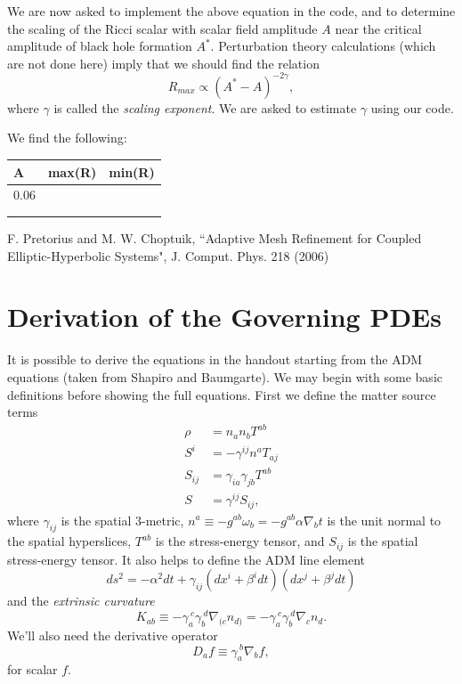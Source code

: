 \documentclass[12pt]{article}
\numberwithin{equation}{section}
\begin{document}
We are now asked to implement the above equation in the code, and to determine the scaling of the Ricci scalar with scalar field amplitude $A$ near the critical amplitude of black hole formation $A^*$.  Perturbation theory calculations (which are not done here) imply that we should find the relation
\begin{equation}
R_{max} \propto (A^* - A)^{-2 \gamma},
\end{equation}
where $\gamma$ is called the \textit{scaling exponent}.  We are asked to estimate $\gamma$ using our code.

We find the following:
\begin{center}
\begin{tabular}{ l | c | r }
	A & max(R) & min(R) \\
	\hline
	\hline
	0.06 &  &  \\
	 &  &  \\
	 &  &  \\
\end{tabular}
\end{center}

\begin{thebibliography}{widestlabel}
	F. Pretorius and M. W. Choptuik, ``Adaptive Mesh Refinement for Coupled Elliptic-Hyperbolic Systems", J. Comput. Phys. 218 (2006)
\end{thebibliography}

\appendix
\section{Derivation of the Governing PDEs}
It is possible to derive the equations in the handout starting from the ADM equations (taken from Shapiro and Baumgarte).  We may begin with some basic definitions before showing the full equations.  First we define the matter source terms
\begin{align}
\rho &= n_a n_b T^{ab} \\
S^i &= -\gamma^{ij} n^a T_{aj} \\
S_{ij} &= \gamma_{ia} \gamma_{jb} T^{ab} \\
S &= \gamma^{ij} S_{ij},
\end{align}
where $\gamma_{ij}$ is the spatial 3-metric, $n^a \equiv - g^{ab} \omega_b = -g^{ab} \alpha \nabla_b t$ is the unit normal to the spatial hyperslices, $T^{ab}$ is the stress-energy tensor, and $S_{ij}$ is the spatial stress-energy tensor.  It also helps to define the ADM line element
\begin{equation} \label{eq:ADM_line_element}
ds^2 = -\alpha^2 dt + \gamma_{ij} (dx^i + \beta^i dt) (dx^j + \beta^j dt)
\end{equation}
and the \textit{extrinsic curvature}
\begin{equation}
K_{ab} \equiv - \gamma_a^{~c} \gamma_b^{~d} \nabla_{(c} n_{d)} = - \gamma_a^{~c} \gamma_b^{~d} \nabla_c n_d.
\end{equation}
We'll also need the derivative operator
\begin{equation}
D_a f \equiv \gamma_{a}^{~b} \nabla_b f,
\end{equation}
for scalar $f$.
\end{document}

